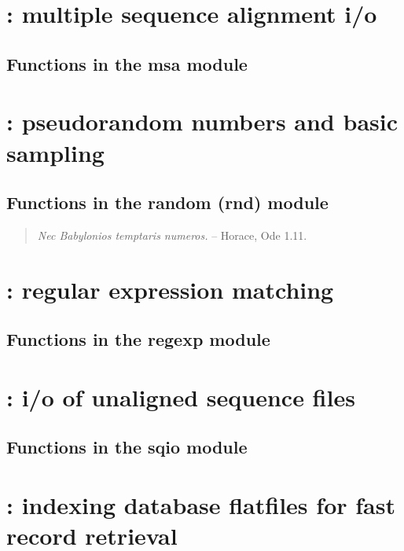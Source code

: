 \documentclass[10pt]{book}
\begin{document}
\newpage
\section{: multiple sequence alignment i/o}

\subsection{Functions in the msa module}


\newpage
\section{: pseudorandom numbers and basic sampling}

\subsection{Functions in the random (rnd) module}

\vspace*{\fill}

\begin{quote}
\emph{Nec Babylonios temptaris numeros.} \hspace{3em} -- Horace, Ode
1.11. \\ 
\end{quote}     

\newpage
\section{: regular expression matching}

\subsection{Functions in the regexp module}


\newpage
\section{: i/o of unaligned sequence files}

\subsection{Functions in the sqio module}


\newpage
\section{: indexing database flatfiles for fast record retrieval}

\end{document}
